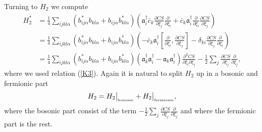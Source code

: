\documentclass[12pt]{article}
\newcommand{\nn}{\nonumber}
\def\a{\alpha}
\def\d{\delta}
\newcommand{\pa}{\partial}
\begin{document}
Turning to $H_2$ we compute 
\begin{align}
H_2^*  &= \frac{1}{4} \sum_{ijkl\a}  ( b^*_{ij\a} b_{kl\a}  +   b_{ij\a} b^*_{kl\a}  )\left(    \mathfrak{a}^\dagger_i   \bar{c}_k  \frac{\pa CS}{\pa \xi_j}   \frac{\pa }{\pa \xi_l} +         \bar{c}_k \mathfrak{a}^\dagger_i   \frac{\pa }{\pa \xi_l}      \frac{\pa CS}{\pa \xi_j}                      \right)
\nn\\
&= 
 \frac{1}{4} \sum_{ijkl\a}  ( b^*_{ij\a} b_{kl\a}  +   b_{ij\a} b^*_{kl\a}  ) \left( 
- \bar{c}_k \mathfrak{a}^\dagger_i   \left[   \frac{\pa }{\pa \xi_l}    ,    \frac{\pa CS}{\pa \xi_j}      \right]  
- \d_{ki} \frac{\pa CS}{\pa \xi_j}   \frac{\pa }{\pa \xi_l} 
 \right)
 \nn\\
 &=
  \frac{1}{4} \sum_{ijkl\a}  ( b^*_{ij\a} b_{kl\a}  +   b_{ij\a} b^*_{kl\a}  ) \left(   
    \mathfrak{a}^\dagger_k \mathfrak{a}^\dagger_i      
  -  \mathfrak{a}_k \mathfrak{a}^\dagger_i     
\right)   \frac{\pa^2 CS}{\pa \xi_l \pa \xi_j}  
-\frac{1}{2} \sum_j \frac{\pa CS}{\pa \xi_j}   \frac{\pa }{\pa \xi_j} ,
\label{stiglitz}
\end{align}
where we used relation (\ref{K3}). 
Again it is natural to split $H_2$ up in a bosonic and fermionic part
\begin{equation}
H_2 = H_2\big\vert_{\mbox{\tiny bosonic}}   +   H_2\big\vert_{\mbox{\tiny fermionic}},
\label{Pl2}
\end{equation}
where the bosonic part consist of the term $-\frac{1}{2}  \sum_j \frac{\pa CS}{\pa \xi_j}   \frac{\pa }{\pa \xi_j} $ and where the fermionic part is the rest.
\end{document}
